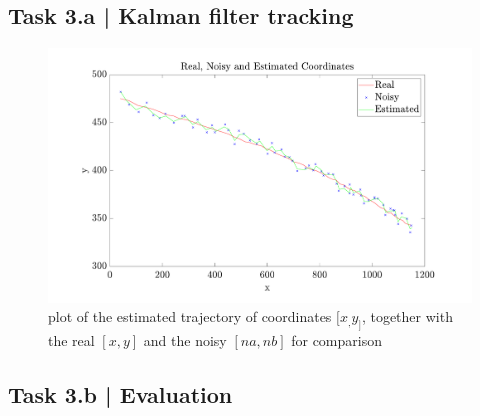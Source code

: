 \documentclass[conference]{IEEEtran}
\begin{document}
\subsection*{Task 3.a | Kalman filter tracking}

\begin{figure}[htbp]
    \centering
    \includegraphics[width=\columnwidth]{figures/kalman.pdf}
    \caption{plot of the estimated trajectory of coordinates $[x_, y_]$, together with the real $[x,y]$ and the noisy $[na, nb]$ for comparison\label{fig:kalman}}
\end{figure}

\subsection*{Task 3.b | Evaluation}

\appendix
\end{document}
